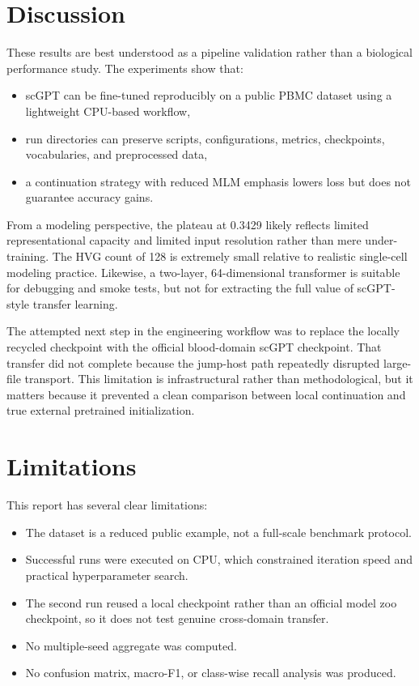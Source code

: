 \documentclass[11pt]{article}
\begin{document}
\section{Discussion}
These results are best understood as a pipeline validation rather than a biological performance study. The experiments show that:
\begin{itemize}
    \item scGPT can be fine-tuned reproducibly on a public PBMC dataset using a lightweight CPU-based workflow,
    \item run directories can preserve scripts, configurations, metrics, checkpoints, vocabularies, and preprocessed data,
    \item a continuation strategy with reduced MLM emphasis lowers loss but does not guarantee accuracy gains.
\end{itemize}

From a modeling perspective, the plateau at 0.3429 likely reflects limited representational capacity and limited input resolution rather than mere under-training. The HVG count of 128 is extremely small relative to realistic single-cell modeling practice. Likewise, a two-layer, 64-dimensional transformer is suitable for debugging and smoke tests, but not for extracting the full value of scGPT-style transfer learning.

The attempted next step in the engineering workflow was to replace the locally recycled checkpoint with the official blood-domain scGPT checkpoint. That transfer did not complete because the jump-host path repeatedly disrupted large-file transport. This limitation is infrastructural rather than methodological, but it matters because it prevented a clean comparison between local continuation and true external pretrained initialization.

\section{Limitations}
This report has several clear limitations:
\begin{itemize}
    \item The dataset is a reduced public example, not a full-scale benchmark protocol.
    \item Successful runs were executed on CPU, which constrained iteration speed and practical hyperparameter search.
    \item The second run reused a local checkpoint rather than an official model zoo checkpoint, so it does not test genuine cross-domain transfer.
    \item No multiple-seed aggregate was computed.
    \item No confusion matrix, macro-F1, or class-wise recall analysis was produced.
\end{itemize}
\end{document}
